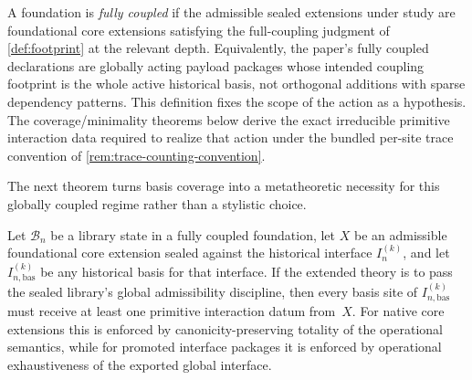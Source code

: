 \documentclass{lmcs}
\newcommand{\B}{\mathcal{B}}
\begin{document}
\begin{defi}
\label{def:fully-coupled}
A foundation is \emph{fully coupled} if the admissible sealed extensions under study are foundational core extensions satisfying the full-coupling judgment of \autoref{def:footprint} at the relevant depth. Equivalently, the paper's fully coupled declarations are globally acting payload packages whose intended coupling footprint is the whole active historical basis, not orthogonal additions with sparse dependency patterns. This definition fixes the scope of the action as a hypothesis. The coverage/minimality theorems below derive the exact irreducible primitive interaction data required to realize that action under the bundled per-site trace convention of \autoref{rem:trace-counting-convention}.
\end{defi}

The next theorem turns basis coverage into a metatheoretic necessity for this globally coupled regime rather than a stylistic choice.

\begin{thm}
\label{thm:coverage}
Let $\B_n$ be a library state in a fully coupled foundation, let $X$ be an
admissible foundational core extension sealed against the historical interface
$I_n^{(k)}$, and let $I_{n,\mathrm{bas}}^{(k)}$ be any historical basis for
that interface. If the extended theory is to pass the sealed library's global
admissibility discipline, then every basis site of
$I_{n,\mathrm{bas}}^{(k)}$ must receive at least one primitive interaction
datum from~$X$. For native core extensions this is enforced by
canonicity-preserving totality of the operational semantics, while for promoted
interface packages it is enforced by operational exhaustiveness of the exported
global interface.
\end{thm}
\end{document}
